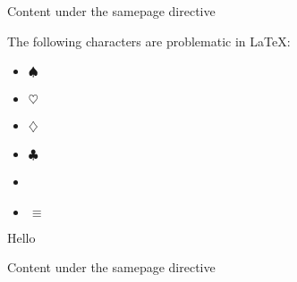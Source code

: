 \documentclass[letterpaper,10pt,english]{sphinxmanual}
\begin{document}
\par\begin{samepage}

Content under the samepage directive

\begin{figure}[htbp]
\centering

\noindent{}
\end{figure}

\end{samepage}\par

\cleardoublepage

The \hspace{0pt}following \hspace{0pt}characters \hspace{0pt}are \hspace{0pt}problematic \hspace{0pt}in \hspace{0pt}LaTeX:
\begin{itemize}
\item {}
 $\spadesuit$

\item {}
 $\heartsuit$

\item {}
 $\diamondsuit$

\item {}
 $\clubsuit$

\item {}
\textmu{}

\item {}
 $\equiv$

\end{itemize}

\clearpage

Hello

\clearpage

\par\begin{samepage}

Content under the samepage directive

\begin{figure}[htbp]
\centering

\noindent{}
\end{figure}

\end{samepage}\par


\vspace{-5px}
\end{document}
